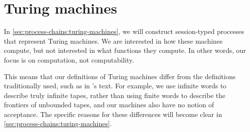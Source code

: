 \section{Turing machines}

In \cref{sec:process-chains:turing-machines}, we will construct session-typed processes that represent Turing machines.
We are interested in how these machines compute, but not interested in what functions they compute.
In other words, our focus is on computation, not computability.

This means that our definitions of Turing machines differ from the definitions traditionally used, such as in \textcite{Hopcroft+Ullman:??}'s text.
For example, we use infinite words to describe truly infinite tapes, rather than using finite words to describe the frontiers of unbounded tapes, and our machines also have no notion of acceptance.
The specific reasons for these differences will become clear in \cref{sec:process-chains:turing-machines}.


